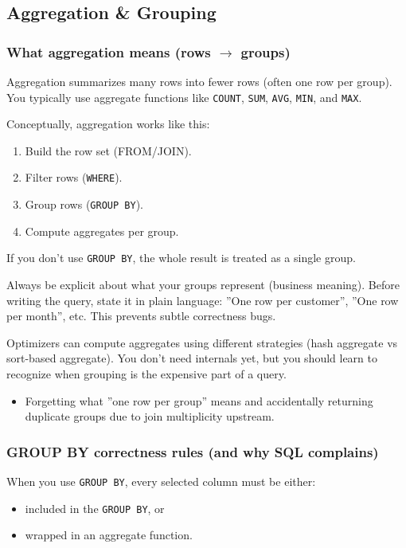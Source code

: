 \subsection{Aggregation \& Grouping}

\subsubsection{What aggregation means (rows $\rightarrow$ groups)}
\J Aggregation summarizes many rows into fewer rows (often one row per group). You typically 
use aggregate functions like \texttt{COUNT}, \texttt{SUM}, \texttt{AVG}, \texttt{MIN}, 
and \texttt{MAX}.

\M Conceptually, aggregation works like this:
\begin{enumerate}
  \item Build the row set (FROM/JOIN).
  \item Filter rows (\texttt{WHERE}).
  \item Group rows (\texttt{GROUP BY}).
  \item Compute aggregates per group.
\end{enumerate}
If you don't use \texttt{GROUP BY}, the whole result is treated as a single group.

\Sx Always be explicit about what your groups represent (business meaning). Before writing 
the query, state it in plain language: ''One row per customer'', ''One row per month'', etc. 
This prevents subtle correctness bugs.

\E Optimizers can compute aggregates using different strategies (hash aggregate vs sort-based 
aggregate). You don't need internals yet, but you should learn to recognize when grouping is 
the expensive part of a query.

\Pitfall
\begin{itemize}
  \item Forgetting what ''one row per group'' means and accidentally returning duplicate groups due 
  to join multiplicity upstream.
\end{itemize}

\subsubsection{GROUP BY correctness rules (and why SQL complains)}
\J When you use \texttt{GROUP BY}, every selected column must be either:
\begin{itemize}
  \item included in the \texttt{GROUP BY}, or
  \item wrapped in an aggregate function.
\end{itemize}

